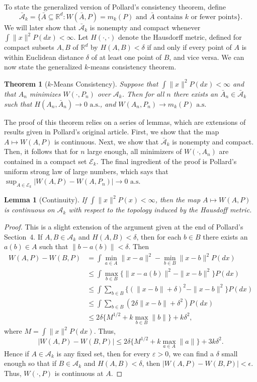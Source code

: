 \documentclass[11pt]{article}
\newtheorem{theorem}{Theorem}
\newtheorem{lemma}{Lemma}
\newcommand{\R}{\mathbb{R}}
\newcommand{\sA}{\mathcal{A}}
\newcommand{\sbA}{\mathcal{\bar A}}
\newcommand{\sE}{\mathcal{E}}
\begin{document}
To state the generalized version of Pollard's consistency theorem, define
\[
  \sbA_k = \{ \bar A \subseteq \R^d
            : W(\bar A, P) = m_k(P)
              \text{ and $\bar A$ contains $k$ or fewer points} \}.
\]
We will later show that $\sbA_k$ is nonempty and compact whenever $\int
\|x\|^2 P(dx) < \infty$.  Let $H(\cdot, \cdot)$ denote the Hausdorff metric,
defined for compact subsets $A, B$ of $\R^d$ by $H(A,B) < \delta$ if
and only if every point of $A$ is within Euclidean distance $\delta$ of at
least one point of $B$, and vice versa.  We can now state the generalized
$k$-means consistency theorem.


\begin{theorem}[$k$-Means Consistency]\label{thm:kmeans-consistency}
Suppose that $\int \|x\|^2 P(dx) < \infty$ and that $A_n$ minimizes $W(\cdot,
P_n)$ over $\sA_k$.  Then for all $n$ there exists an $\bar A_n \in \sbA_k$
such that $H(A_n, \bar A_n) \to 0\text{ a.s.}$, and $W(A_n, P_n) \to
m_k(P)\text{ a.s.}$ \end{theorem}


The proof of this theorem relies on a series of lemmas, which are extensions
of results given in Pollard's original article.  First, we show that the map
$A \mapsto W(A, P)$ is continuous.  Next, we show that $\sbA_k$ is nonempty
and compact.  Then, it follows that for $n$ large enough, all minimizers of
$W(\cdot, A_n)$ are contained in a compact set $\sE_k$.  The final ingredient
of the proof is Pollard's uniform strong law of large numbers, which says that
$\sup_{A \in \sE_k} |W(A,P) - W(A,P_n)| \to 0\text{ a.s.}$


\begin{lemma}[Continuity]\label{lem:kmeans-continuous}
If $\int \|x\|^2 P(x) < \infty$, then the map $A \mapsto W(A, P)$ is
continuous on $\sA_k$ with respect to the topology induced by the Hausdoff
metric.
\end{lemma}
\begin{proof}
This is a slight extension of the argument given at the end of Pollard's
Section~4.  If $A, B \in \sA_k$ and $H(A, B) < \delta$, then for each $b \in
B$ there exists an $a(b) \in A$ such that $\|b - a(b)\| < \delta$.  Then
\begin{align*}
  W(A, P) - W(B, P)
    &= \int \min_{a \in A} \|x - a\|^2 - \min_{b \in B} \|x - b\|^2 P(dx) \\
    &\leq \int \max_{b \in B} \{ \|x - a(b)\|^2 - \|x - b\|^2 \} P(dx) \\
    &\leq \int \sum_{b \in B} \{ (\|x - b\| + \delta)^2 - \|x - b\|^2 \} P(dx) \\
    &\leq \int \sum_{b \in B}  ( 2 \delta \|x - b\| + \delta^2) P(dx) \\
    &\leq 2 \delta \{M^{1/2} + k \max_{b \in B} \|b\|\} + k \delta^2,
\end{align*}
where $M = \int \|x\|^2 P(dx)$.  Thus,
\[
  |W(A, P) - W(B, P)|
    \leq 2 \delta \{M^{1/2} + k \max_{a \in A} \|a\|\} + 3 k \delta^2.
\]
Hence if $A \in \sA_k$ is any fixed set, then for every $\varepsilon > 0$, we
can find a $\delta$ small enough so that if $B \in \sA_k$ and $H(A, B) <
\delta$, then $|W(A,P) - W(B,P)| < \epsilon$.  Thus, $W(\cdot, P)$ is
continuous at $A$.
\end{proof}
\end{document}
